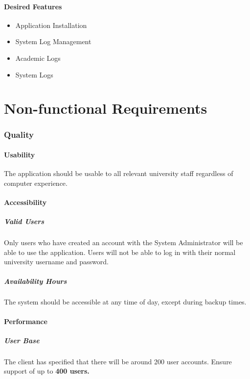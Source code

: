 \documentclass{article}
\begin{document}
\subsection{Desired Features}
\begin{itemize}
  \item Application Installation
  \item System Log Management
  \item Academic Logs
  \item System Logs
\end{itemize}

\part{Non-functional Requirements}
\section{Quality}
\subsection{Usability}
The application should be usable to all relevant university staff
regardless of computer experience.
\subsection{Accessibility}
\subsubsection{Valid Users}
Only users who have created an account with the System Administrator will be able
to use the application. Users will not be able to log in with their normal
university username and password.
\subsubsection{Availability Hours}
The system should be accessible at any time of day, except during backup times.
\subsection{Performance}
\subsubsection{User Base}
The client has specified that there will be around 200 user accounts. Ensure
support of up to \textbf{400 users.}
\end{document}
